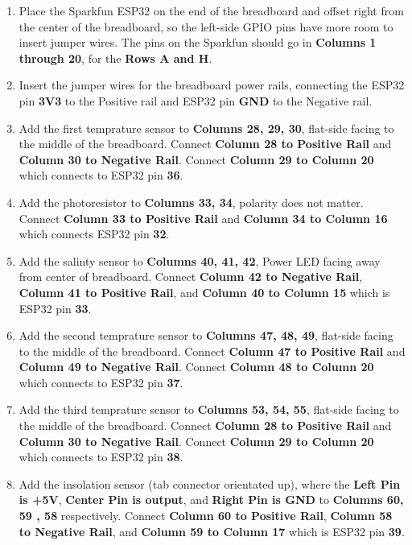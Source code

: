 \begin{enumerate}
    \item Place the Sparkfun ESP32 on the end of the breadboard and offset right from the center of the breadboard,
    so the left-side GPIO pins have more room to insert jumper wires. The pins on the Sparkfun should go in \textbf{Columns 1 through 20}, for the \textbf{Rows A and H}.
    \item Insert the jumper wires for the breadboard power rails, connecting the ESP32 pin \textbf{3V3} to the Positive rail and ESP32 pin \textbf{GND} to the Negative rail.
    \item Add the first temprature sensor to \textbf{Columns 28, 29, 30}, flat-side facing to the middle of the breadboard. Connect \textbf{Column 28 to Positive Rail} and \textbf{Column 30 to Negative Rail}. Connect \textbf{Column 29 to Column 20} which connects to ESP32 pin \textbf{36}.
    \item Add the photoresistor to \textbf{Columns 33, 34}, polarity does not matter. Connect \textbf{Column 33 to Positive Rail} and \textbf{Column 34 to Column 16} which connects ESP32 pin \textbf{32}.
    \item Add the salinty sensor to \textbf{Columns 40, 41, 42}, Power LED facing away from center of breadboard. Connect \textbf{Column 42 to Negative Rail}, \textbf{Column 41 to Positive Rail}, and \textbf{Column 40 to Column 15} which is ESP32 pin \textbf{33}.
    \item Add the second temprature sensor to \textbf{Columns 47, 48, 49}, flat-side facing to the middle of the breadboard. Connect \textbf{Column 47 to Positive Rail} and \textbf{Column 49 to Negative Rail}. Connect \textbf{Column 48 to Column 20} which connects to ESP32 pin \textbf{37}.
    \item Add the third temprature sensor to \textbf{Columns 53, 54, 55}, flat-side facing to the middle of the breadboard. Connect \textbf{Column 28 to Positive Rail} and \textbf{Column 30 to Negative Rail}. Connect \textbf{Column 29 to Column 20} which connects to ESP32 pin \textbf{38}.
    \item Add the insolation sensor (tab connector orientated up), where the \textbf{Left Pin is +5V}, \textbf{Center Pin is output}, and \textbf{Right Pin is GND} to \textbf{Columns 60, 59 , 58} respectively. Connect \textbf{Column 60 to Positive Rail}, \textbf{Column 58 to Negative Rail}, and \textbf{Column 59 to Column 17} which is ESP32 pin \textbf{39}.
\end{enumerate}
